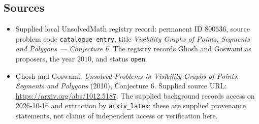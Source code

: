 \documentclass[11pt]{article}
\begin{document}
\subsection{Sources}
\begin{itemize}
\item Supplied local UnsolvedMath registry record: permanent ID $800536$, source problem code \texttt{catalogue entry}, title \emph{Visibility Graphs of Points, Segments and Polygons --- Conjecture 6}. The registry records Ghosh and Goswami as proposers, the year $2010$, and status \texttt{open}.
\item Ghosh and Goswami, \emph{Unsolved Problems in Visibility Graphs of Points, Segments and Polygons} (2010), Conjecture 6. Supplied source URL: \url{https://arxiv.org/abs/1012.5187}. The supplied background records access on 2026-10-16 and extraction by \texttt{arxiv\_latex}; these are supplied provenance statements, not claims of independent access or verification here.
\end{itemize}
\end{document}
